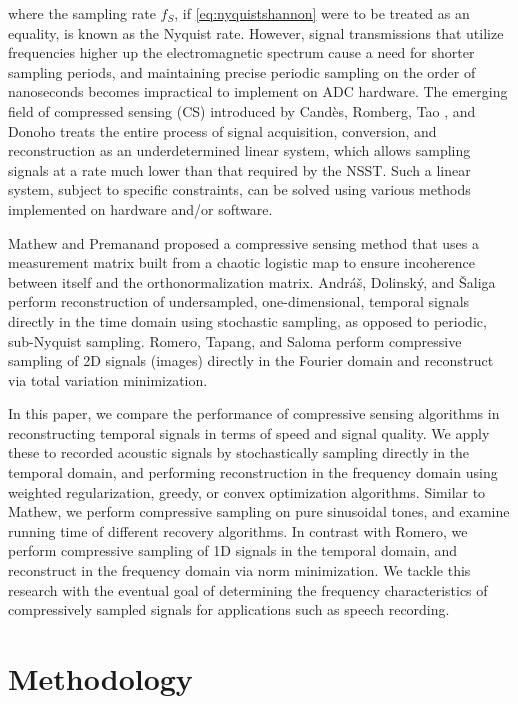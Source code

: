 \documentclass[10pt,a4paper,twoside]{article}
\begin{document}
where the sampling rate $f_S$, if \eqref{eq:nyquistshannon} were to be treated as an equality, is known as the Nyquist rate. However, signal transmissions that utilize frequencies higher up the electromagnetic spectrum cause a need for shorter sampling periods, and maintaining precise periodic sampling on the order of nanoseconds becomes impractical to implement on ADC hardware. The emerging field of compressed sensing (CS) introduced by Cand\`{e}s, Romberg, Tao \cite{candes}, and Donoho \cite{donoho} treats the entire process of signal acquisition, conversion, and reconstruction as an underdetermined linear system, which allows sampling signals at a rate much lower than that required by the NSST. Such a linear system, subject to specific constraints, can be solved using various methods implemented on hardware and/or software.

Mathew and Premanand \cite{mathew} proposed a compressive sensing method that uses a measurement matrix built from a chaotic logistic map to ensure incoherence between itself and the orthonormalization matrix. Andr\'{a}\v{s}, Dolinsk\'{y}, and \v{S}aliga \cite{andras} perform reconstruction of undersampled, one-dimensional, temporal signals directly in the time domain using stochastic sampling, as opposed to periodic, sub-Nyquist sampling. Romero, Tapang, and Saloma \cite{romero16,romero18} perform compressive sampling of 2D signals (images) directly in the Fourier domain and reconstruct via total variation minimization.

In this paper, we compare the performance of compressive sensing algorithms in reconstructing temporal signals in terms of speed and signal quality. We apply these to recorded acoustic signals by stochastically sampling directly in the temporal domain, and performing reconstruction in the frequency domain using weighted regularization, greedy, or convex optimization algorithms. Similar to Mathew, we perform compressive sampling on pure sinusoidal tones, and examine running time of different recovery algorithms. In contrast with Romero, we perform compressive sampling of 1D signals in the temporal domain, and reconstruct in the frequency domain via norm minimization. We tackle this research with the eventual goal of determining the frequency characteristics of compressively sampled signals for applications such as speech recording.

\section{Methodology}\label{sec:Metho}
\medskip
\end{document}
